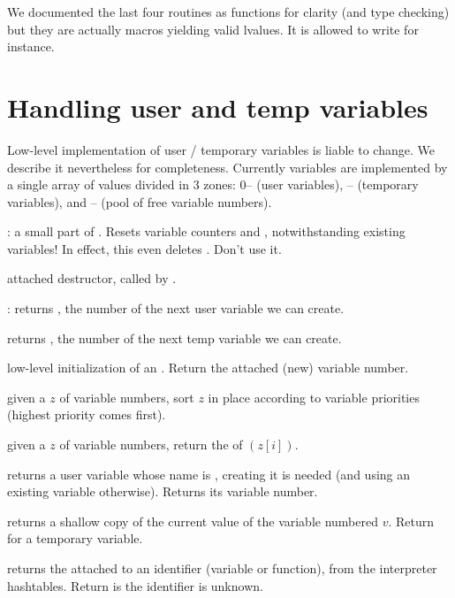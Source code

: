 We documented the last four routines as functions for clarity (and type
checking) but they are actually macros yielding valid lvalues. It is allowed
to write  for instance.

\section{Handling user and temp variables}
Low-level implementation of user / temporary variables is liable to change. We
describe it nevertheless for completeness. Currently variables are
implemented by a single array of values divided in 3 zones: 0--
(user variables), -- (temporary variables),
and -- (pool of free variable numbers).


: a small part of . Resets
variable counters  and , notwithstanding existing
variables! In effect, this even deletes . Don't use it.

 attached destructor, called by
.

: returns , the number of the next user
variable we can create.

 returns , the number of the
next temp variable we can create.

 low-level initialization of an
. Return the attached (new) variable number.

 given a  $z$ of variable
numbers, sort $z$ in place according to variable priorities (highest priority
comes first).

 given a  $z$ of variable numbers,
return the  of $(z[i])$.


 returns a user variable whose name
is , creating it is needed (and using an existing variable otherwise).
Returns its variable number.

 returns a shallow copy of the
current value of the variable numbered $v$. Return  for a temporary
variable.

 returns the  attached
to an identifier  (variable or function), from the interpreter
hashtables. Return  is the identifier is unknown.

